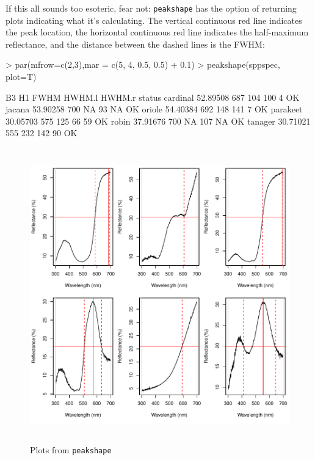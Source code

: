 \documentclass{article}
\newcommand{\code}[1]{{\tt #1}}  %
\begin{document}
If this all sounds too esoteric, fear not: \code{peakshape} has the option of returning plots indicating what it's calculating. The vertical continuous red line indicates the peak location, the horizontal continuous red line indicates the half-maximum reflectance, and the distance between the dashed lines is the FWHM:

\begin{Schunk}
\begin{Sinput}
> par(mfrow=c(2,3),mar = c(5, 4, 0.5, 0.5) + 0.1)
> peakshape(sppspec, plot=T)
\end{Sinput}
\begin{Soutput}
               B3  H1 FWHM HWHM.l HWHM.r status
cardinal 52.89508 687  104    100      4     OK
jacana   53.90258 700   NA     93     NA     OK
oriole   54.40384 692  148    141      7     OK
parakeet 30.05703 575  125     66     59     OK
robin    37.91676 700   NA    107     NA     OK
tanager  30.71021 555  232    142     90     OK
\end{Soutput}
\end{Schunk}

\begin{figure}[h] %
\begin{center}
\includegraphics[width=6in, height=5in]{pavo-fwhm}
\end{center}
\caption{Plots from \code{peakshape}}
\label{figure:fwhm}
\end{figure}
\end{document}
